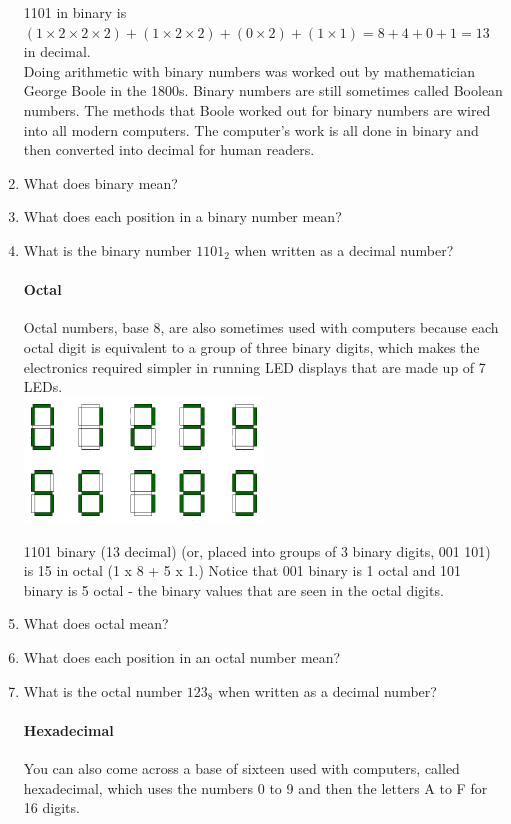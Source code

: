 \documentclass[12pt]{article}
\begin{document}
\begin{enumerate}
1101 in binary is $(1 \times 2 \times 2 \times 2) + (1 \times 2 \times 2) + (0 \times 2) + (1 \times 1) = 8 + 4 + 0 + 1 = 13$ in decimal.\\

Doing arithmetic with binary numbers was worked out by mathematician George Boole in the 1800s. Binary numbers are still sometimes called Boolean numbers. The methods that Boole worked out for binary numbers are wired into all modern computers. The computer's work is all done in binary and then converted into decimal for human readers.

\item What does binary mean?
\item What does each position in a binary number mean?
\item What is the binary number $1101_2$ when written as a decimal number?

\paragraph{Octal}
Octal numbers, base 8, are also sometimes used with computers because each octal digit is equivalent to a group of three binary digits, which makes the electronics required simpler in running LED displays that are made up of 7 LEDs.\\

\includegraphics[width=0.5\textwidth]{7segment}

1101 binary (13 decimal) (or, placed into groups of 3 binary digits, 001 101) is 15 in octal (1 x 8 + 5 x 1.) Notice that 001 binary is 1 octal and 101 binary is 5 octal - the binary values that are seen in the octal digits.\\

\item What does octal mean?
\item What does each position in an octal number mean?
\item What is the octal number $123_8$ when written as a decimal number?

\paragraph{Hexadecimal}
You can also come across a base of sixteen used with computers, called hexadecimal, which uses the numbers 0 to 9 and then the letters A to F for 16 digits.\\


\end{enumerate}
\end{document}
